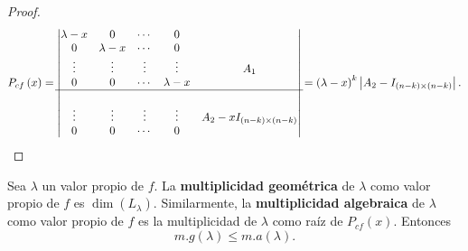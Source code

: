 \begin{proof}
\[P_{cf}\left(x\right) = \begin{vmatrix} \lambda - x & 0 & \cdots & 0\\
	0 & \lambda - x& \cdots & 0  \\
	\vdots & \vdots & \vdots & \vdots & A_{1} \\
0 & 0 & \cdots & \lambda  - x \\ \hline \\
\vdots & \vdots & \vdots & \vdots & A_{2} - x I_{\left(n - k\right)\times\left(n - k\right)}  \\
0 & 0 & \cdots & 0\end{vmatrix} = \left(\lambda - x\right)^{k} \left|A_{2} - I_{\left(n - k\right) \times \left(n - k\right)}\right|
 .\]
\end{proof}
\begin{fdefinition}[]
\normalfont Sea $\displaystyle \lambda  $ un valor propio de $\displaystyle f $. La \textbf{multiplicidad geométrica} de $\displaystyle \lambda  $ como valor propio de $\displaystyle f $ es $\displaystyle \dim\left(L_{\lambda }\right) $. Similarmente, la \textbf{multiplicidad algebraica}  de $\displaystyle \lambda  $ como valor propio de $\displaystyle f $ es la multiplicidad de $\displaystyle \lambda  $ como raíz de $\displaystyle P_{cf}\left(x\right) $. Entonces
\[m.g\left(\lambda \right) \leq m. a \left(\lambda \right) .\]
\end{fdefinition}
